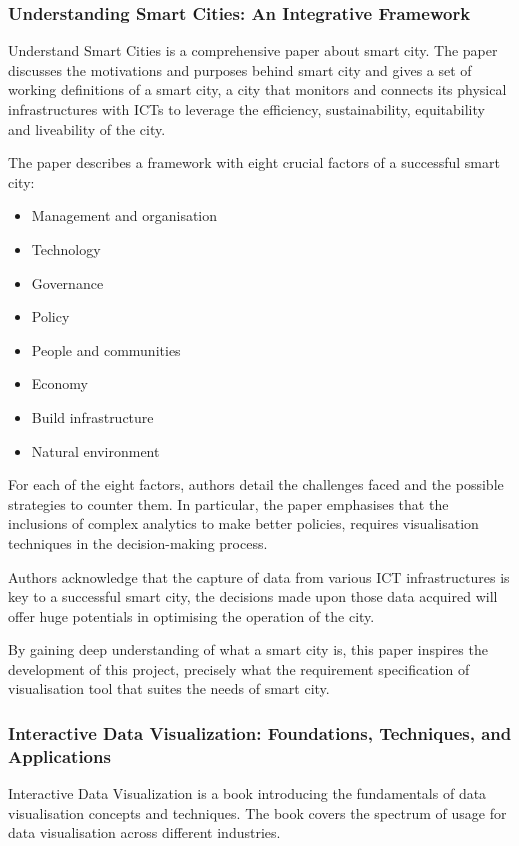 \documentclass[doc,natbib]{apa6}
\begin{document}
\subsubsection{Understanding Smart Cities: An Integrative Framework}\hfil\newline
Understand Smart Cities \citep{Chourabi2011} is a comprehensive paper about smart city. The paper discusses the motivations and purposes behind smart city and gives a set of working definitions of a smart city, a city that monitors and connects its physical infrastructures with ICTs to leverage the efficiency, sustainability, equitability and liveability of the city. 

The paper describes a framework with eight crucial factors of a successful smart city:
\begin{multicols}{2}
	
	\begin{itemize}
		\item Management and organisation
		\item Technology
		\item Governance
		\item Policy
		\item People and communities
		\item Economy
		\item Build infrastructure
		\item Natural environment
	\end{itemize}
\end{multicols}
For each of the eight factors, authors detail the challenges faced and the possible strategies to counter them. In particular, the paper emphasises that the inclusions of complex analytics to make better policies, requires visualisation techniques in the decision-making process.

Authors acknowledge that the capture of data from various ICT infrastructures is key to a successful smart city, the decisions made upon those data acquired will offer huge potentials in optimising the operation of the city.

By gaining deep understanding of what a smart city is, this paper inspires the development of this project, precisely what the requirement specification of visualisation tool that suites the needs of smart city.

\subsubsection{Interactive Data Visualization: Foundations, Techniques, and Applications}\hfil\newline
Interactive Data Visualization is a book \citep{Ward2010} introducing the fundamentals of data visualisation concepts and techniques. The book covers the spectrum of usage for data visualisation across different industries.
\end{document}
